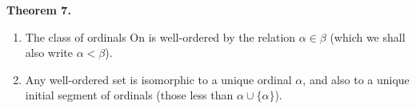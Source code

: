 \textbf{Theorem 7.}

\begin{enumerate}
\item[(a)] The class of ordinals $\mathrm{On}$ is well-ordered by the relation $\alpha \in \beta$ (which we shall also write $\alpha < \beta$).
\item[(b)] Any well-ordered set is isomorphic to a unique ordinal $\alpha$, and also to a unique initial segment of ordinals (those less than $\alpha \cup \{\alpha\}$).
\end{enumerate}
